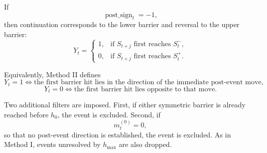 \documentclass[11pt,a4paper]{article}
\begin{document}
	If
	\[
	\operatorname{post\_sign}_t=-1,
	\]
	then continuation corresponds to the lower barrier and reversal to the upper barrier:
	\[
	Y_t =
	\begin{cases}
		1, & \text{if } S_{t+j} \text{ first reaches } S_t^{-},\\[1mm]
		0, & \text{if } S_{t+j} \text{ first reaches } S_t^{+}.
	\end{cases}
	\]
	
	Equivalently, Method II defines
	\[
	Y_t=1 \iff \text{the first barrier hit lies in the direction of the immediate post-event move,}
	\]
	\[
	Y_t=0 \iff \text{the first barrier hit lies opposite to that move.}
	\]
	
	Two additional filters are imposed. First, if either symmetric barrier is already reached before \(h_0\), the event is excluded. Second, if
	\[
	m_t^{(0)} = 0,
	\]
	so that no post-event direction is established, the event is excluded. As in Method I, events unresolved by \(h_{\max}\) are also dropped.
	
\end{document}
